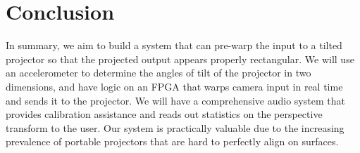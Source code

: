 \documentclass{article}
\begin{document}
\section{Conclusion}
In summary, we aim to build a system that can pre-warp the input to a tilted projector so that the projected output appears properly rectangular. We will use an accelerometer to determine the angles of tilt of the projector in two dimensions, and have logic on an FPGA that warps camera input in real time and sends it to the projector. We will have a comprehensive audio system that provides calibration assistance and reads out statistics on the perspective transform to the user. Our system is practically valuable due to the increasing prevalence of portable projectors that are hard to perfectly align on surfaces.
\end{document}

